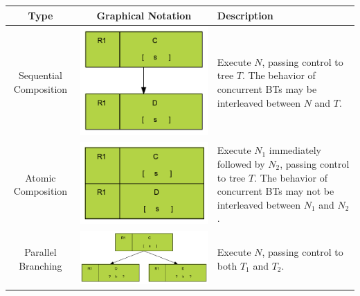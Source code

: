\documentclass[]{article}
\begin{document}
\begin{tabularx}{\textwidth}{|c|c|X|} 
\textbf{Type} & \textbf{Graphical Notation} &  \textbf{Description}\\ \hline
Sequential Composition&\includegraphics{figs/AppendixB/Composition/Sequential} &Execute $N$, passing control to tree $T$. The behavior of concurrent BTs may be interleaved between $N$ and $T$.\\ \hline
Atomic Composition&\includegraphics{figs/AppendixB/Composition/Atomic} & Execute $N_1$ immediately followed by $N_2$, passing control to tree $T$. The behavior of concurrent BTs may not be interleaved between $N_1$ and $N_2$.\\ \hline
Parallel Branching&\includegraphics{figs/AppendixB/Composition/Parallel} &  Execute $N$, passing control to both $T_1$ and $T_2$.\\ \hline

\end{tabularx}
\end{document}
